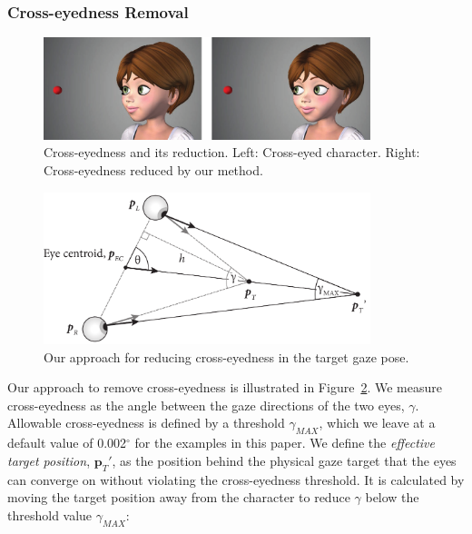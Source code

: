 \subsubsection{Cross-eyedness Removal}

\begin{figure}
\centering
\includegraphics[width=0.85\textwidth]{stylizedgaze/Figures/CrosseyednessFixExample-small.pdf}
\caption{Cross-eyedness and its reduction. Left: Cross-eyed character. Right: Cross-eyedness reduced by our method.}
\label{fig:CrosseyednessFixExample}
\end{figure}

\begin{figure}
\centering
\includegraphics[width=0.85\textwidth]{stylizedgaze/Figures/CrosseyednessRemoval.pdf}
\caption{Our approach for reducing cross-eyedness in the target gaze pose.}
\label{fig:CrosseyednessRemoval}
\end{figure}

Our approach to remove cross-eyedness is illustrated in Figure~\ref{fig:CrosseyednessRemoval}. We measure cross-eyedness as the angle between the gaze directions of the two eyes, $\gamma$. Allowable cross-eyedness is defined by a threshold $\gamma_{MAX}$, which we leave at a default value of 0.002$^{\circ}$ for the examples in this paper.
We define the \textit{effective target position}, $\mathbf{p}_T'$, as the position behind the physical gaze target that the eyes can converge on without violating the cross-eyedness threshold. It is calculated by moving the target position away from the character to reduce $\gamma$ below the threshold value $\gamma_{MAX}$:

